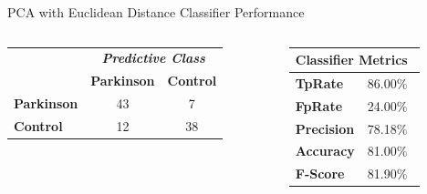 \documentclass{beamer}
\begin{document}
\begin{frame}{PCA with Euclidean Distance Classifier Performance}
   \begin{block}{}
   
   \begin{columns}[c]
     \begin{column}{0.5\linewidth}
				\begin{table}[!htbp]
					\centering
					\begin{tabular}{l|c|c|}
					\cline{2-3}
					\multicolumn{1}{c}{}                         & \multicolumn{2}{|c|}{\textit{\textbf{Predictive Class}}} \\ \cline{2-3} 
																											 & \textbf{Parkinson}      & \textbf{Control}         \\ \hline
					\multicolumn{1}{|l|}{\textbf{Parkinson}} & 43       & 7           \\ \hline
					\multicolumn{1}{|l|}{\textbf{Control}}     & 12           & 38     \\ \hline
					\end{tabular}
			\end{table}

     \end{column}

     \begin{column}{0.55\linewidth}
						\begin{table}[htbp!]
						\begin{tabular}{|l|r|}
						\hline
						\multicolumn{2}{|l|}{\textbf{Classifier Metrics}} \\ \hline
							\textbf{TpRate}                    & 86.00$\%$\                 \\ \hline
							\textbf{FpRate}                    & 24.00$\%$\                \\ \hline
							\textbf{Precision}                 & 78.18$\%$\                \\ \hline
							\textbf{Accuracy}                  & 81.00$\%$\                \\ \hline
							\textbf{F-Score}                 & 81.90$\%$\                \\ \hline
						\end{tabular}
						\end{table}
    \end{column}
\end{columns}
\end{block}
\end{frame}
\end{document}
